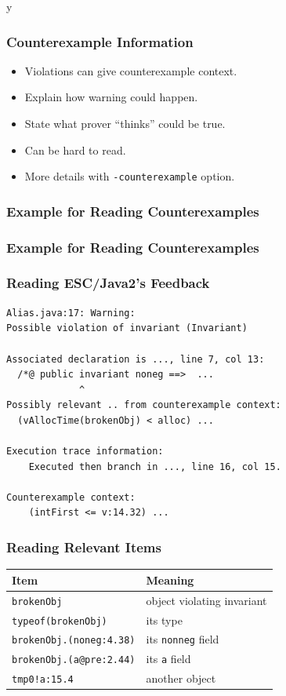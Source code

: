 \if y\MAKEHANDOUTS \documentclass[t,compress,landscape,handout]{beamer}
\begin{document}
\begin{frame}
\frametitle{Counterexample Information}
\begin{itemize}
\item
Violations can give counterexample context.

\item
Explain how warning could happen.

\item
State what prover ``thinks'' could be true.

\item
Can be hard to read.

\item
More details with \texttt{-counterexample} option.
\end{itemize}
\end{frame}

\begin{frame}[fragile]
\frametitle{Example for Reading Counterexamples}
\begin{example}

\end{example}
\end{frame}

\begin{frame}[fragile]
\frametitle{Example for Reading Counterexamples}
\begin{example}

\end{example}
\end{frame}

\begin{frame}[fragile]
\frametitle{Reading ESC/Java2's Feedback}
\begin{verbatim}
Alias.java:17: Warning: 
Possible violation of invariant (Invariant)

Associated declaration is ..., line 7, col 13:
  /*@ public invariant noneg ==>  ...
             ^
Possibly relevant .. from counterexample context:  
  (vAllocTime(brokenObj) < alloc) ...

Execution trace information:
    Executed then branch in ..., line 16, col 15.

Counterexample context:
    (intFirst <= v:14.32) ...
\end{verbatim}
\end{frame}

\begin{frame}
\frametitle{Reading Relevant Items}
\begin{tabular}{ll}
Item & Meaning \\
\hline
\texttt{brokenObj} & object violating invariant \\
\texttt{typeof(brokenObj)} & its type \\
\texttt{brokenObj.(noneg:4.38)} & its \texttt{nonneg} field \\
\texttt{brokenObj.(a@pre:2.44)} & its \texttt{a} field \\
\texttt{tmp0!a:15.4} & another object
\end{tabular}
\end{frame}
\end{document}
